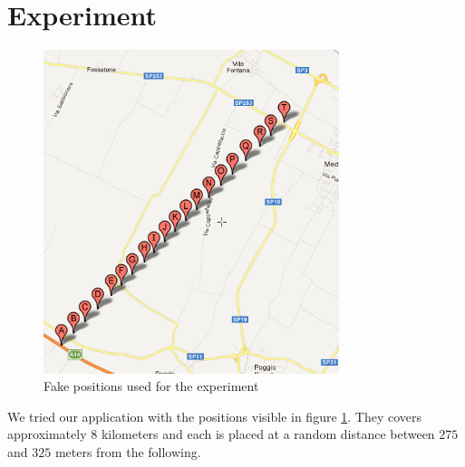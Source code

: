 \section{Experiment}
	\begin{figure}[htbp]
	\centering
	\includegraphics[width=3.4in]{imgs/punti_mappa.png}
	\caption{Fake positions used for the experiment}
	\label{fig:positions_experiment}
	\end{figure}

We tried our application with the positions visible in figure \ref{fig:positions_experiment}. They covers approximately $8$ kilometers  and each is placed at a random distance between $275$ and $325$ meters from the following.
